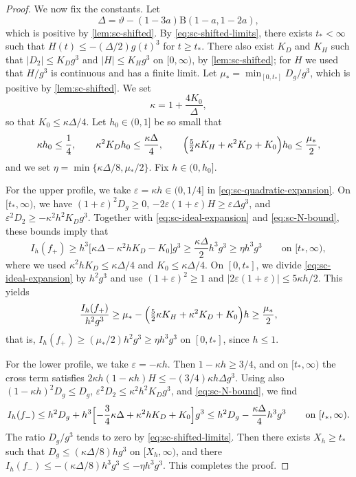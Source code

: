\begin{proof}
We now fix the constants. Let
\[
 \Delta=\vartheta-(1-3a)\mathrm B(1-a,1-2a),
\]
which is positive by \cref{lem:sc-shifted}. By \eqref{eq:sc-shifted-limits}, there exists $t_*<\infty$ such that $H(t)\le-(\Delta/2)g(t)^3$ for $t\ge t_*$. There also exist $K_D$ and $K_H$ such that $|D_2|\le K_Dg^3$ and $|H|\le K_Hg^3$ on $[0,\infty)$, by \cref{lem:sc-shifted}; for $H$ we used that $H/g^3$ is continuous and has a finite limit. Let $\mu_*=\min_{[0,t_*]}D_g/g^3$, which is positive by \cref{lem:sc-shifted}. We set
\[
 \kappa=1+\frac{4K_0}{\Delta},
\]
so that $K_0\le\kappa\Delta/4$. Let $h_0\in(0,1]$ be so small that
\[
 \kappa h_0\le\frac14,\qquad \kappa^2K_Dh_0\le\frac{\kappa\Delta}4,\qquad
 \Bigl(\tfrac52\kappa K_H+\kappa^2K_D+K_0\Bigr)h_0\le\frac{\mu_*}2 ,
\]
and we set $\eta=\min\{\kappa\Delta/8,\mu_*/2\}$. Fix $h\in(0,h_0]$.

For the upper profile, we take $\varepsilon=\kappa h\in(0,1/4]$ in \eqref{eq:sc-quadratic-expansion}. On $[t_*,\infty)$, we have $(1+\varepsilon)^2D_g\ge0$, $-2\varepsilon(1+\varepsilon)H\ge\varepsilon\Delta g^3$, and $\varepsilon^2D_2\ge-\kappa^2h^2K_Dg^3$. Together with \eqref{eq:sc-ideal-expansion} and \eqref{eq:sc-N-bound}, these bounds imply that
\[
 I_h(f_+)\ge h^3\bigl[\kappa\Delta-\kappa^2hK_D-K_0\bigr]g^3\ge\frac{\kappa\Delta}2h^3g^3\ge\eta h^3g^3
 \qquad\text{on }[t_*,\infty),
\]
where we used $\kappa^2hK_D\le\kappa\Delta/4$ and $K_0\le\kappa\Delta/4$. On $[0,t_*]$, we divide \eqref{eq:sc-ideal-expansion} by $h^2g^3$ and use $(1+\varepsilon)^2\ge1$ and $|2\varepsilon(1+\varepsilon)|\le5\kappa h/2$. This yields
\[
 \frac{I_h(f_+)}{h^2g^3}\ge\mu_*-\Bigl(\tfrac52\kappa K_H+\kappa^2K_D+K_0\Bigr)h\ge\frac{\mu_*}2,
\]
that is, $I_h(f_+)\ge(\mu_*/2)h^2g^3\ge\eta h^3g^3$ on $[0,t_*]$, since $h\le1$.

For the lower profile, we take $\varepsilon=-\kappa h$. Then $1-\kappa h\ge3/4$, and on $[t_*,\infty)$ the cross term satisfies $2\kappa h(1-\kappa h)H\le-(3/4)\kappa h\Delta g^3$. Using also $(1-\kappa h)^2D_g\le D_g$, $\varepsilon^2D_2\le\kappa^2h^2K_Dg^3$, and \eqref{eq:sc-N-bound}, we find
\[
 I_h(f_-)\le h^2D_g+h^3\Bigl[-\frac34\kappa\Delta+\kappa^2hK_D+K_0\Bigr]g^3
 \le h^2D_g-\frac{\kappa\Delta}4h^3g^3
 \qquad\text{on }[t_*,\infty).
\]
The ratio $D_g/g^3$ tends to zero by \eqref{eq:sc-shifted-limits}. Then there exists $X_h\ge t_*$ such that $D_g\le(\kappa\Delta/8)hg^3$ on $[X_h,\infty)$, and there $I_h(f_-)\le-(\kappa\Delta/8)h^3g^3\le-\eta h^3g^3$. This completes the proof.
\end{proof}

